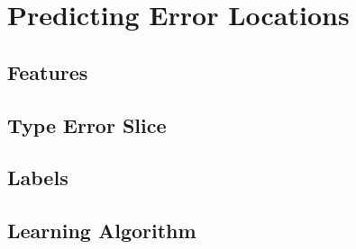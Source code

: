 \section{Predicting Error Locations}
\label{sec:localization}

\subsection{Features}
\label{subsec:features}






\subsection{Type Error Slice}
\label{subsec:error-slice}


\subsection{Labels}
\label{subsec:labels}


\subsection{Learning Algorithm}
\label{subsec:models}

